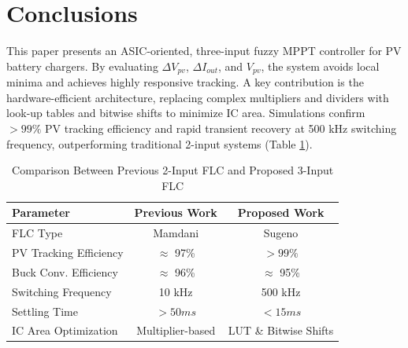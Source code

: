 \documentclass[conference]{IEEEtran}
\begin{document}
\section{Conclusions}
\label{sec:conclusion}
This paper presents an ASIC-oriented, three-input fuzzy MPPT controller for PV battery chargers. By evaluating $\Delta V_{pv}$, $\Delta I_{out}$, and $V_{pv}$, the system avoids local minima and achieves highly responsive tracking. A key contribution is the hardware-efficient architecture, replacing complex multipliers and dividers with look-up tables and bitwise shifts to minimize IC area. Simulations confirm $>99\%$ PV tracking efficiency and rapid transient recovery at 500 kHz switching frequency, outperforming traditional 2-input systems (Table \ref{tab:comparison}).

\begin{table}[h]
\centering
\caption{Comparison Between Previous 2-Input FLC and Proposed 3-Input FLC}
\label{tab:comparison}
\begin{tabular}{|l|c|c|}
\hline
\textbf{Parameter} & \textbf{Previous Work} & \textbf{Proposed Work} \\ \hline
FLC Type & Mamdani & Sugeno \\ \hline
PV Tracking Efficiency & $\approx$ 97\% & $> 99\%$ \\ \hline
Buck Conv. Efficiency & $\approx$ 96\% & $\approx$ 95\% \\ \hline
Switching Frequency & 10 kHz & 500 kHz \\ \hline
Settling Time & $>50ms$ &  $<15ms$ \\ \hline
IC Area Optimization & Multiplier-based & LUT \& Bitwise Shifts \\ \hline
\end{tabular}
\end{table}
\end{document}
